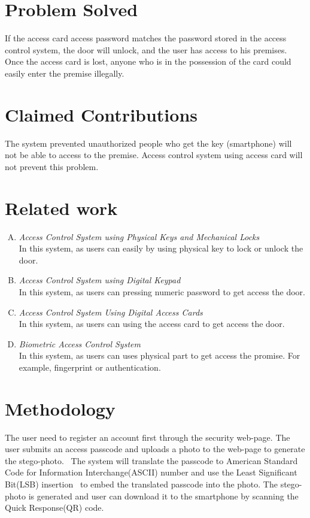 \documentclass[a4paper, 12pt]{article}
\begin{document}
\section{Problem Solved}
\hspace{1cm}If the access card access password matches the password stored in the access control system, the door will unlock, and the user has access to his premises.
Once the access card is lost, anyone who is in the possession of the card could easily enter the premise illegally.

\section{Claimed Contributions}
\hspace{1cm}The system prevented unauthorized people who get the key (smartphone) will not be able to access to the premise. Access control system using access card will not prevent this problem.

\section{Related work}
\begin{enumerate}[A.]
\item \textit{Access Control System using Physical Keys and Mechanical Locks}\\
In this system, as users can easily by using physical key to lock or unlock the door.\\
\item \textit{Access Control System using Digital Keypad}\\
In this system, as users can pressing numeric password to get access the door.\\
\item \textit{Access Control System Using Digital Access Cards}\\
In this system, as users can using the access card to get access the door.\\
\item \textit{Biometric Access Control System}\\
In this system, as users can uses physical part to get access the promise. For example, fingerprint or authentication.~\cite{Batool6151452}
\end{enumerate}

\section{Methodology}
\hspace{1cm}The user need to register an account first through the security web-page. The user submits an access passcode and uploads a photo to the web-page to generate the stego-photo.~\cite{Zhao4224148} The system will translate the passcode to American Standard Code for Information Interchange(ASCII) number and use the Least Significant Bit(LSB) insertion~\cite{Katzenbeisser2000} to embed the translated passcode into the photo. The stego-photo is generated and user can download it to the smartphone by scanning the Quick Response(QR) code.
\hfill
\end{document}

